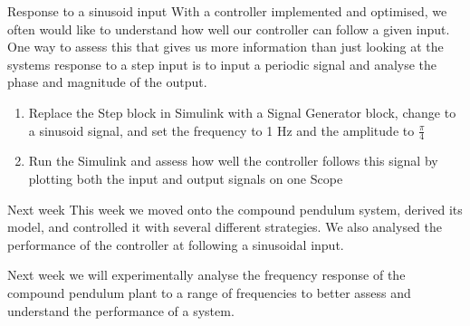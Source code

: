 \documentclass[9pt]{beamer-control}
\begin{document}

\begin{frame}{Response to a sinusoid input}
With a controller implemented and optimised, we often would like to understand how well our controller can follow a given input. One way to assess this that gives us more information than just looking at the systems response to a step input is to input a periodic signal and analyse the phase and magnitude of the output.

\begin{enumerate}
	\item Replace the Step block in Simulink with a Signal Generator block, change to a sinusoid signal, and set the frequency to 1 Hz and the amplitude to $\tfrac{\pi}{4}$
	\item Run the Simulink and assess how well the controller follows this signal by plotting both the input and output signals on one Scope
\end{enumerate}

\end{frame}



\begin{frame}{Next week}
	This week we moved onto the compound pendulum system, derived its model, and controlled it with several different strategies. We also analysed the performance of the controller at following a sinusoidal input.
	
	Next week we will experimentally analyse the frequency response of the compound pendulum plant to a range of frequencies to better assess and understand the performance of a system.
\end{frame}
\end{document}

